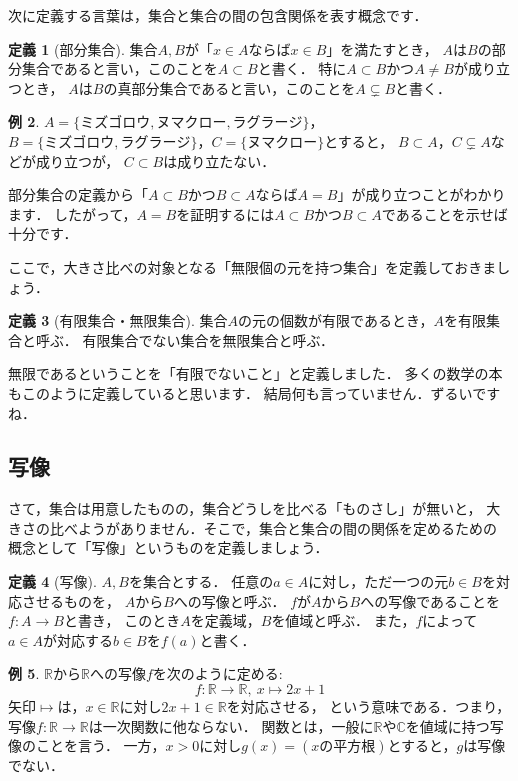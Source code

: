 ﻿\documentclass[./main]{subfiles} %
\theoremstyle{definition}
\newtheorem{hamadadefi}{定義}[section]
\newtheorem{hamadaex}[hamadadefi]{例}
\begin{document}
次に定義する言葉は，集合と集合の間の包含関係を表す概念です．

\begin{hamadadefi}[部分集合]
集合$A,B$が「$x\in A$ならば$x\in B$」を満たすとき，
$A$は$B$の部分集合であると言い，このことを$A\subset B$と書く．
特に$A\subset B$かつ$A\neq B$が成り立つとき，
$A$は$B$の真部分集合であると言い，このことを$A\subsetneq B$と書く．
\end{hamadadefi}

\begin{hamadaex}
$A=\{ミズゴロウ, ヌマクロー, ラグラージ\}$，
$B=\{ミズゴロウ, ラグラージ\}$，$C=\{ヌマクロー\}$とすると，
$B\subset A$，$C\subsetneq A$などが成り立つが，
$C\subset B$は成り立たない．
\end{hamadaex}

部分集合の定義から「$A\subset B$かつ$B\subset A$ならば$A=B$」が成り立つことがわかります．
したがって，$A=B$を証明するには$A\subset B$かつ$B\subset A$であることを示せば
十分です．

ここで，大きさ比べの対象となる「無限個の元を持つ集合」を定義しておきましょう．

\begin{hamadadefi}[有限集合・無限集合]
集合$A$の元の個数が有限であるとき，$A$を有限集合と呼ぶ．
有限集合でない集合を無限集合と呼ぶ．
\end{hamadadefi}

無限であるということを「有限でないこと」と定義しました．
多くの数学の本もこのように定義していると思います．
{\footnotesize 結局何も言っていません．ずるいですね．}

\subsection{写像}
さて，集合は用意したものの，集合どうしを比べる「ものさし」が無いと，
大きさの比べようがありません．そこで，集合と集合の間の関係を定めるための
概念として「写像」というものを定義しましょう．

\begin{hamadadefi}[写像]
\label{map}
$A,B$を集合とする．
任意の$a\in A$に対し，ただ一つの元$b\in B$を対応させるものを，
$A$から$B$への写像と呼ぶ．
$f$が$A$から$B$への写像であることを$f\colon A\to B$と書き，
このとき$A$を定義域，$B$を値域と呼ぶ．
また，$f$によって$a\in A$が対応する$b\in B$を$f(a)$と書く．
\end{hamadadefi}

\begin{hamadaex}
\label{mapex}
$\mathbb{R}$から$\mathbb{R}$への写像$f$を次のように定める:
\[
f\colon\mathbb{R}\to\mathbb{R},\ x\mapsto 2x+1
\]
矢印$\mapsto$は，$x\in\mathbb{R}$に対し$2x+1\in\mathbb{R}$を対応させる，
という意味である．つまり，写像$f\colon\mathbb{R}\to\mathbb{R}$は一次関数に他ならない．
関数とは，一般に$\mathbb{R}$や$\mathbb{C}$を値域に持つ写像のことを言う．
一方，$x>0$に対し$g(x)=(xの平方根)$とすると，$g$は写像でない．
\end{hamadaex}
\end{document}
